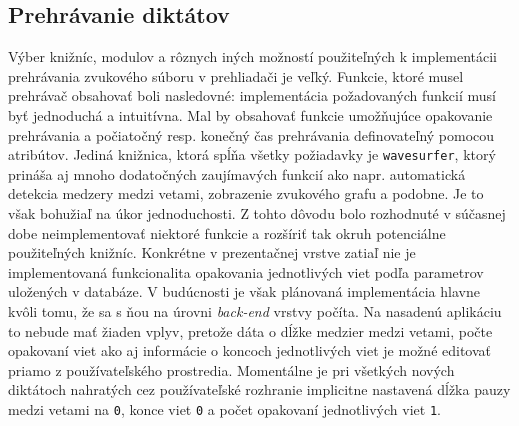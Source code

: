 \documentclass[12pt,oneside]{fithesis2}
\begin{document}
		\subsection{Prehrávanie diktátov} \label{prehravanie}
		
	\par Výber knižníc, modulov a rôznych iných možností použiteľných k implementácii prehrávania zvukového súboru v prehliadači je veľký. Funkcie, ktoré musel prehrávač obsahovať boli nasledovné: implementácia požadovaných funkcií musí byť jednoduchá a intuitívna. Mal by obsahovať funkcie umožňujúce opakovanie prehrávania a počiatočný resp. konečný čas prehrávania definovateľný pomocou atribútov. Jediná knižnica, ktorá spĺňa všetky požiadavky je \texttt{wavesurfer}, ktorý prináša aj mnoho dodatočných zaujímavých funkcií ako napr. automatická detekcia medzery medzi vetami, zobrazenie zvukového grafu a podobne. Je to však bohužiaľ na úkor jednoduchosti. Z tohto dôvodu bolo rozhodnuté v súčasnej dobe neimplementovať niektoré funkcie a rozšíriť tak okruh potenciálne použiteľných knižníc. Konkrétne v prezentačnej vrstve zatiaľ nie je implementovaná funkcionalita opakovania jednotlivých viet podľa parametrov uložených v databáze. V budúcnosti je však plánovaná implementácia hlavne kvôli tomu, že sa s ňou na úrovni \textit{back-end} vrstvy počíta. Na nasadenú aplikáciu to nebude mať žiaden vplyv, pretože dáta o dĺžke medzier medzi vetami, počte opakovaní viet ako aj informácie o koncoch jednotlivých viet je možné editovať priamo z používateľského prostredia. Momentálne je pri všetkých nových diktátoch nahratých cez používateľské rozhranie implicitne nastavená dĺžka pauzy medzi vetami na \texttt{0}, konce viet \texttt{0} a počet opakovaní jednotlivých viet \texttt{1}.
	
\end{document}
